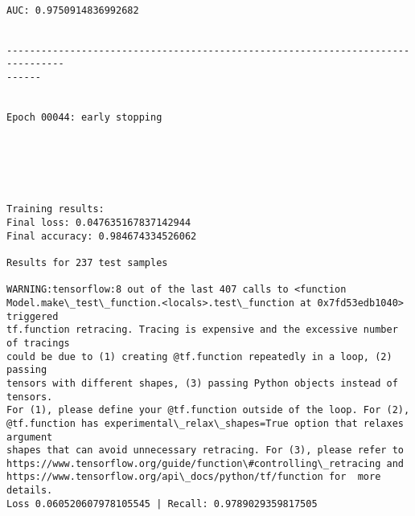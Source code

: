 \documentclass[11pt]{article}
\begin{document}
    \begin{center}
    \end{center}
    { \hspace*{\fill} \\}
    
    \begin{Verbatim}[commandchars=\\\{\}]
AUC: 0.9750914836992682


--------------------------------------------------------------------------------
------


Epoch 00044: early stopping
    \end{Verbatim}

    \begin{center}
    \end{center}
    { \hspace*{\fill} \\}
    
    \begin{center}
    \end{center}
    { \hspace*{\fill} \\}
    
    \begin{Verbatim}[commandchars=\\\{\}]

Training results:
Final loss: 0.047635167837142944
Final accuracy: 0.984674334526062

Results for 237 test samples

WARNING:tensorflow:8 out of the last 407 calls to <function
Model.make\_test\_function.<locals>.test\_function at 0x7fd53edb1040> triggered
tf.function retracing. Tracing is expensive and the excessive number of tracings
could be due to (1) creating @tf.function repeatedly in a loop, (2) passing
tensors with different shapes, (3) passing Python objects instead of tensors.
For (1), please define your @tf.function outside of the loop. For (2),
@tf.function has experimental\_relax\_shapes=True option that relaxes argument
shapes that can avoid unnecessary retracing. For (3), please refer to
https://www.tensorflow.org/guide/function\#controlling\_retracing and
https://www.tensorflow.org/api\_docs/python/tf/function for  more details.
Loss 0.060520607978105545 | Recall: 0.9789029359817505



    \end{Verbatim}
\end{document}
